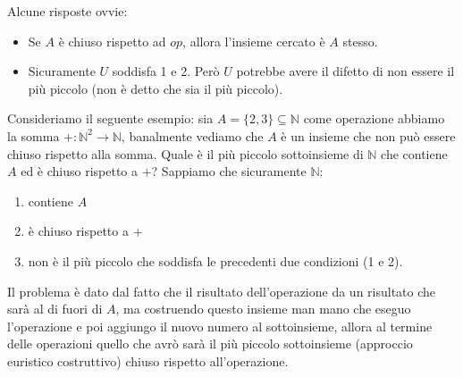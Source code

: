 \documentclass{article}
\begin{document}
Alcune risposte ovvie:
\begin{itemize}
    \item Se $A$ è chiuso rispetto ad $op$, allora l'insieme cercato è $A$ stesso.
    \item Sicuramente $U$ soddisfa 1 e 2. Però $U$ potrebbe avere il difetto di non
          essere il più piccolo (non è detto che sia il più piccolo).
\end{itemize}
Consideriamo il seguente esempio: sia $A=\{2,3\}\subseteq\mathbb{N}$ come operazione
abbiamo la somma $+:\mathbb{N}^2\rightarrow\mathbb{N}$, banalmente vediamo che $A$ è un insieme
che non può essere chiuso rispetto alla somma. Quale è il più piccolo sottoinsieme di $\mathbb{N}$
che contiene $A$ ed è chiuso rispetto a $+$?
Sappiamo che sicuramente $\mathbb{N}$:
\begin{enumerate}
    \item contiene $A$
    \item è chiuso rispetto a $+$
    \item non è il più piccolo che soddisfa le precedenti due condizioni (1 e 2).
\end{enumerate}
Il problema è dato dal fatto che il risultato dell'operazione da un risultato che sarà
al di fuori di $A$, ma costruendo questo insieme man mano che eseguo
l'operazione e poi aggiungo il nuovo numero al sottoinsieme, allora al termine delle operazioni quello
che avrò sarà il più piccolo sottoinsieme (approccio euristico costruttivo) chiuso rispetto all'operazione.
\end{document}
